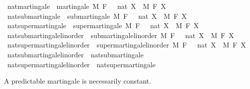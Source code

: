 \begin{isabellebody}
%
\endisadelimdocument
{}\isamarkupfalse%
\ nat{\isacharunderscore}{\kern0pt}martingale\ {\isacharequal}{\kern0pt}\ martingale\ M\ F\ {\isachardoublequoteopen}{}\ {\isacharcolon}{\kern0pt}{\isacharcolon}{\kern0pt}\ nat{\isachardoublequoteclose}\ X\ \ M\ F\ X\isanewline
{}\isamarkupfalse%
\ nat{\isacharunderscore}{\kern0pt}submartingale\ {\isacharequal}{\kern0pt}\ submartingale\ M\ F\ {\isachardoublequoteopen}{}\ {\isacharcolon}{\kern0pt}{\isacharcolon}{\kern0pt}\ nat{\isachardoublequoteclose}\ X\ \ M\ F\ X\isanewline
{}\isamarkupfalse%
\ nat{\isacharunderscore}{\kern0pt}supermartingale\ {\isacharequal}{\kern0pt}\ supermartingale\ M\ F\ {\isachardoublequoteopen}{}\ {\isacharcolon}{\kern0pt}{\isacharcolon}{\kern0pt}\ nat{\isachardoublequoteclose}\ X\ \ M\ F\ X\isanewline
\isanewline
{}\isamarkupfalse%
\ nat{\isacharunderscore}{\kern0pt}submartingale{\isacharunderscore}{\kern0pt}linorder\ {\isacharequal}{\kern0pt}\ submartingale{\isacharunderscore}{\kern0pt}linorder\ M\ F\ {\isachardoublequoteopen}{}\ {\isacharcolon}{\kern0pt}{\isacharcolon}{\kern0pt}\ nat{\isachardoublequoteclose}\ X\ \ M\ F\ X\isanewline
{}\isamarkupfalse%
\ nat{\isacharunderscore}{\kern0pt}supermartingale{\isacharunderscore}{\kern0pt}linorder\ {\isacharequal}{\kern0pt}\ supermartingale{\isacharunderscore}{\kern0pt}linorder\ M\ F\ {\isachardoublequoteopen}{}\ {\isacharcolon}{\kern0pt}{\isacharcolon}{\kern0pt}\ nat{\isachardoublequoteclose}\ X\ \ M\ F\ X\isanewline
\isanewline
{}\isamarkupfalse%
\ nat{\isacharunderscore}{\kern0pt}submartingale{\isacharunderscore}{\kern0pt}linorder\ {\isasymsubseteq}\ nat{\isacharunderscore}{\kern0pt}submartingale%
\isadelimproof
\ %
\endisadelimproof
%
\isatagproof
\isacommand{{\isachardot}{\kern0pt}{\isachardot}{\kern0pt}}\isamarkupfalse%
%
\endisatagproof
{\isafoldproof}%
%
\isadelimproof
%
\endisadelimproof
\isanewline
{}\isamarkupfalse%
\ nat{\isacharunderscore}{\kern0pt}supermartingale{\isacharunderscore}{\kern0pt}linorder\ {\isasymsubseteq}\ nat{\isacharunderscore}{\kern0pt}supermartingale%
\isadelimproof
\ %
\endisadelimproof
%
\isatagproof
\isacommand{{\isachardot}{\kern0pt}{\isachardot}{\kern0pt}}\isamarkupfalse%
%
\endisatagproof
{\isafoldproof}%
%
\isadelimproof
%
\endisadelimproof
%
\begin{isamarkuptext}%
A predictable martingale is necessarily constant.%

\end{isamarkuptext}
\end{isabellebody}

